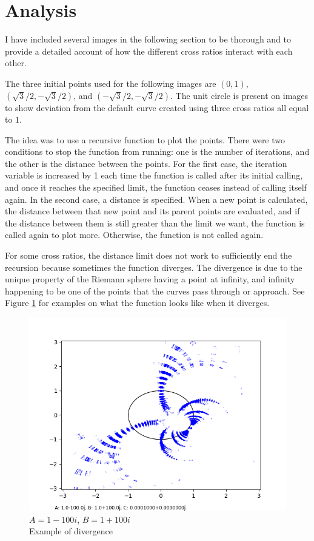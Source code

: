 \documentclass[12pt,a4paper,reqno,parskip=full]{amsart}
\numberwithin{equation}{section}
\theoremstyle{plain}
\theoremstyle{definition}
\begin{document}


\section{Analysis}
I have included several images in the following section to be thorough and to provide a detailed account of how the different cross ratios interact with each other. 

The three initial points used for the following images are 
$(0,1)$, $\left({\sqrt{3}}/{2},{-\sqrt{3}}/{2}\right)$, and $\left({-\sqrt{3}}/{2},{-\sqrt{3}}/{2}\right)$.
The unit circle is present on images to show deviation from the default curve created using three cross ratios all equal to $1$.

The idea was to use a recursive function to plot the points. There were two conditions to stop the function from running: one is the number of iterations, and the other is the distance between the points. For the first case, the iteration variable is increased by 1 each time the function is called after its initial calling, and once it reaches the specified limit, the function ceases instead of calling itself again. In the second case, a distance is specified. When a new point is calculated, the distance between that new point and its parent points are evaluated, and if the distance between them is still greater than the limit we want, the function is called again to plot more. Otherwise, the function is not called again.

For some cross ratios, the distance limit does not work to sufficiently end the recursion because sometimes the function diverges. The divergence is due to the unique property of the Riemann sphere having a point at infinity, and infinity happening to be one of the points that the curves pass through or approach. See Figure \ref{fig:divergent cross ratio} for examples on what the function looks like when it diverges. 

\begin{figure}[H]
    \centering
     \captionsetup{justification=centering}
    \includegraphics[width=0.5\linewidth]{nn/a-100 b100 h40 d0.025}
    \caption{$A=1-100i$, $B=1+100i$\\Example of divergence}
    \label{fig:divergent cross ratio}
\end{figure}
\end{document}

